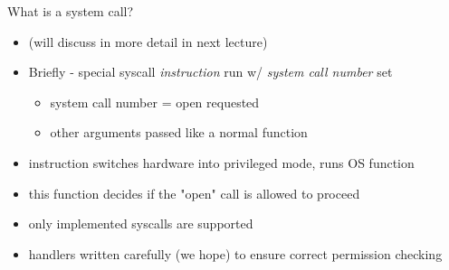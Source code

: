 \begin{frame}{What is a system call?}

	\begin{itemize}
	\item (will discuss in more detail in next lecture)
	\item Briefly - special syscall {\em instruction} run w/ \textit{system call number} set
            \begin{itemize}
            \item system call number = open requested
            \item other arguments passed like a normal function
            \end{itemize}
	\item instruction switches hardware into privileged mode, runs OS function
	\item this function decides if the "open" call is allowed to proceed
	\item only implemented syscalls are supported
	\item handlers written carefully (we hope) to ensure correct permission checking
	\end{itemize}

\end{frame}
	
